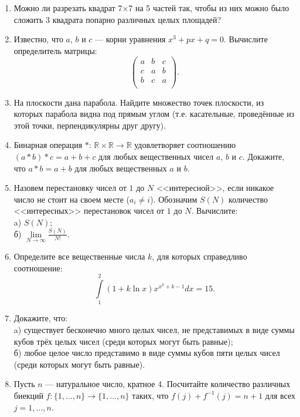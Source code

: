 \begin{enumerate}
\item Можно ли разрезать квадрат 7$\times$7 на 5 частей так, чтобы из них можно было сложить 3 квадрата попарно различных целых площадей?

\item Известно, что $a$, $b$ и $c$ --- корни уравнения $x^3 + px + q = 0$. Вычислите определитель матрицы:
\begin{equation*}
\begin{pmatrix}
a & b & c\\
c & a & b\\
b & c & a\\
\end{pmatrix}.
\end{equation*}

\item На плоскости дана парабола. Найдите множество точек плоскости, из которых парабола видна под прямым углом (т.е. касательные, проведённые из этой точки, перпендикулярны друг другу).

\item Бинарная операция $*$: $\mathbb{R} \times \mathbb{R} \rightarrow \mathbb{R}$ удовлетворяет соотношению $(a * b) * c = a + b + c$ для любых вещественных чисел $a$, $b$ и $c$. Докажите, что $a * b = a + b$ для любых вещественных $a$ и $b$.

\item Назовем перестановку чисел от $1$ до $N$ <<интересной>>, если никакое число не стоит на своем месте ($a_i \ne i$). Обозначим $S(N)$ количество <<интересных>> перестановок чисел от $1$ до $N$. Вычислите:\\
a) $S(N)$;\\
б) $\lim\limits_{N \rightarrow \infty} \frac{S(N)}{N!}$.

\item Определите все вещественные числа $k$, для которых справедливо соотношение:
$$\int\limits_{1}^{2} \left( 1 + k \ln{x} \right) x^{x^k + k - 1} dx = 15.$$

\item Докажите, что:\\
a) существует бесконечно много целых чисел, не представимых в виде суммы кубов трёх целых чисел (среди которых могут быть равные);\\
б) любое целое число представимо в виде суммы кубов пяти целых чисел (среди которых могут быть равные).

\item Пусть $n$ --- натуральное число, кратное 4. Посчитайте количество различных биекций $f: \{1, \hdots, n\} \rightarrow \{1, \hdots, n\}$ таких, что $f(j) + f^{-1}(j) = n + 1$ для всех $j = 1, \hdots, n$. 


\end{enumerate}
